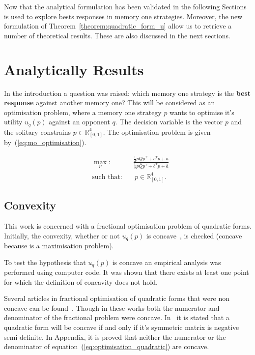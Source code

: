 \documentclass[10pt]{article}
\newcommand{\R}{\mathbb{R}}
\begin{document}
Now that the analytical formulation has been validated in the following Sections
is used to explore bests responses in memory one strategies. Moreover, the new
formulation of Theorem~\ref{theorem:quadratic_form_u} allow us to retrieve a number
of theoretical results. These are also discussed in the next sections.

\section{Analytically Results}\label{section:analytical_results}

In the introduction a question was raised: which memory one strategy is the \textbf{best response}
against another memory one? This will be considered as an optimisation problem,
where a memory one strategy \(p\) wants to optimise it's utility \(u_q(p)\)
against an opponent \(q\). The decision variable is the vector \(p\) and the
solitary constrains \(p \in \R^4_{[0, 1]} \). The optimisation problem is
given by~(\ref{eq:mo_optimisation}).

\begin{equation}\label{eq:mo_optimisation}
\begin{aligned}
& \max_p: && \frac{\frac{1}{2}  p  Q  p^T + c^T p + a} 
                  {\frac{1}{2}  p  \bar{Q}  p^T + \bar{c}^T  p + \bar{a}}
\\
& \text{such that}: && \ p \in \R^4_{[0, 1]}.
\end{aligned}
\end{equation}

\subsection{Convexity}

This work is concerned with a fractional optimisation problem of quadratic forms.
Initially, the convexity, whether or not \(u_{q}(p)\) is concave~\cite{Gradshteyn2007},
is checked (concave because is a maximisation problem).

To test the hypothesis that \(u_q(p)\) is concave an empirical analysis
was performed using computer code. %
It was shown that there exists at least one point for which the definition of
concavity does not hold.

Several articles in fractional optimisation of quadratic forms that were non concave
can be found~\cite{Beck2009, Hongyan2014}. Though in these works both the numerator
and denominator of the fractional problem were concave. In~\cite{Anton2014} it is
stated that a quadratic form will be concave if and only if it's symmetric matrix is
negative semi definite. In Appendix, it is proved that neither the numerator or %
the denominator of equation~(\ref{eq:optimisation_quadratic}) are concave.
\end{document}
